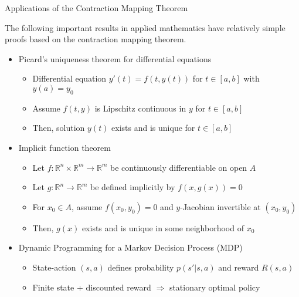 \documentclass[10pt,english]{beamer}
\begin{document}
\begin{frame}{Applications of the Contraction Mapping Theorem}

The following important results in applied mathematics have relatively simple proofs based on the contraction mapping theorem.
\vspace{2mm}

\begin{itemize}
\setlength\itemsep{3mm}
\item<1-> Picard's uniqueness theorem for differential equations \vspace{1mm}
\begin{itemize} 
  \setlength\itemsep{1.5mm}
  \item Differential equation $y'(t) = f(t,y(t))$ for $t\in [a,b]$ with $y(a)=y_0$ 
  \item  Assume $f(t,y)$ is Lipschitz continuous in $y$ for $t\in [a,b]$
  \item Then, solution $y(t)$ exists and is unique for $t\in [a,b]$
\end{itemize}
\item<2-> Implicit function theorem \vspace{1mm}
\begin{itemize} 
  \setlength\itemsep{1.5mm}
  \item Let $f\colon \mathbb{R}^n \times \mathbb{R}^{m} \to \mathbb{R}^m$ be continuously differentiable on open $A$
  \item Let $g\colon \mathbb{R}^n \to \mathbb{R}^{m}$ be defined implicitly by $f(x,g(x))=0$
  \item For $x_0\in A$, assume $f(x_0,y_0)=0$ and $y$-Jacobian invertible at $(x_0,y_0)$
  \item Then, $g(x)$ exists and is unique in some neighborhood of $x_0$
\end{itemize}
\item<3-> Dynamic Programming for a Markov Decision Process (MDP) \vspace{1mm}
\begin{itemize} 
  \setlength\itemsep{1.5mm}
  \item State-action $(s,a)$ defines probability $p(s'|s,a)$ and reward $R(s,a)$
  \item Finite state + discounted reward $\Rightarrow$ stationary optimal policy
\end{itemize}
\end{itemize}

\end{frame}
\end{document}
